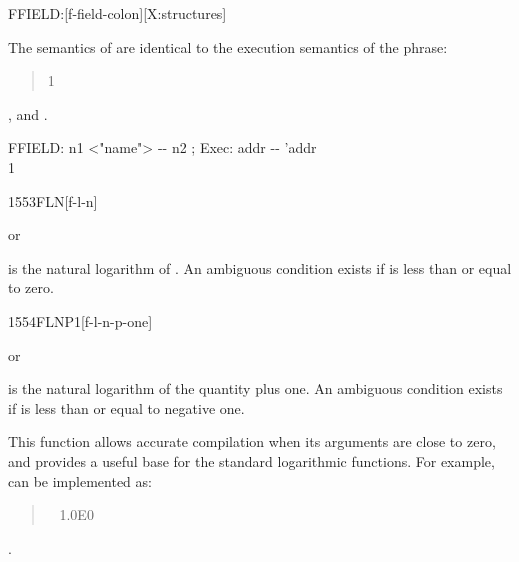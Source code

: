 
\begin{worddef}{}{FFIELD:}[f-field-colon][X:structures]
\item \stack{}{}

	The semantics of  are identical to the
	execution semantics of the phrase:
	\begin{quote}\ttfamily
		 1  
	\end{quote}

\see {},
	 and
	.

	\begin{implement} %

		\word{:} FFIELD:\tab{} n1 <"name"> -{}- n2 ; Exec: addr -{}- 'addr \\
		\tab {} 1   \\
		\word{;}
	\end{implement}
\end{worddef}


\begin{worddef}{1553}{FLN}[f-l-n]
\item {} or

	 is the natural logarithm of . An ambiguous
	condition exists if  is less than or equal to zero.
\end{worddef}


\begin{worddef}{1554}{FLNP1}[f-l-n-p-one]
\item {} or

	 is the natural logarithm of the quantity 
	plus one. An ambiguous condition exists if  is less
	than or equal to negative one.

	\begin{rationale} %
		This function allows accurate compilation when its arguments
		are close to zero, and provides a useful base for the standard
		logarithmic functions. For example,  can be
		implemented as:

		\begin{quote}\ttfamily
			\word[core]{:}  ~
				1.0E0  ~ 
			\word[core]{;}
		\end{quote}
	\see {}.
	\end{rationale}
\end{worddef}


